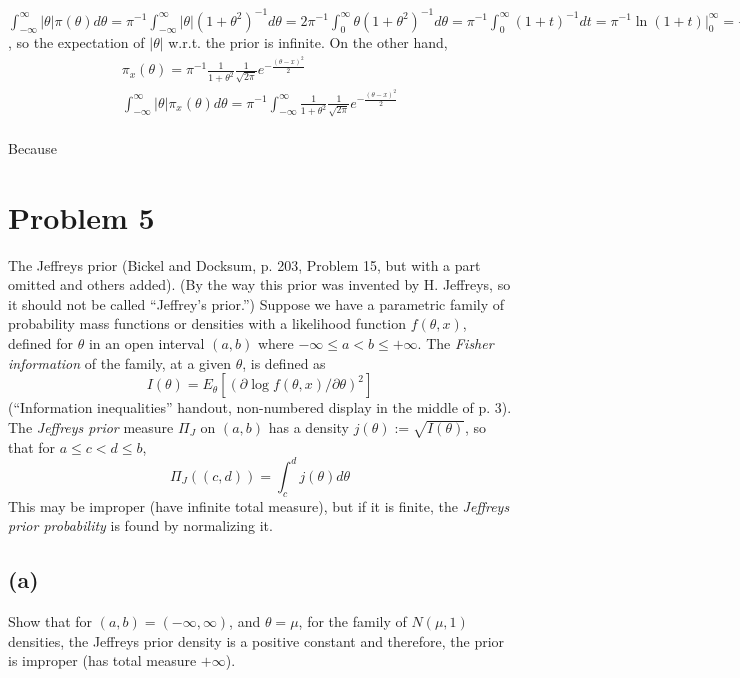 \documentclass[11pt]{article}
\newcommand{\ProbS}{\iftrue}
\newcommand{\ProbE}{\fi}
\begin{document}
$
\int_{-\infty}^{\infty} |\theta| \pi(\theta) d\theta =
\pi^{-1} \int_{-\infty}^{\infty} |\theta| (1+\theta^2)^{-1} d\theta =
2\pi^{-1} \int_{0}^{\infty} \theta (1+\theta^2)^{-1} d\theta =
\pi^{-1} \int_{0}^{\infty} (1+t)^{-1}dt =
\pi^{-1} \ln(1+t) |_{0}^{\infty} = +\infty
$
, so the expectation of $|\theta|$ w.r.t. the prior is infinite.
On the other hand,\\
\begin{align}
\pi_{x}(\theta) =
\pi^{-1} \frac{1}{1+\theta^2} \frac{1}{\sqrt{2\pi}} e^{-\frac{(\theta-x)^2}{2}}
\\
\int_{-\infty}^{\infty} |\theta| \pi_{x}(\theta) d\theta =
\pi^{-1} \int_{-\infty}^{\infty} \frac{1}{1+\theta^2} \frac{1}{\sqrt{2\pi}} e^{-\frac{(\theta-x)^2}{2}}
\end{align}
\\
Because

\section{Problem 5}
\ProbS
The Jeffreys prior (Bickel and Docksum, p. 203, Problem 15, but with a part omitted and others added). (By the way this prior was invented by H. Jeffreys, so it should not be called ``Jeffrey's prior.'')
Suppose we have a parametric family of probability mass functions or densities with a likelihood function $f(\theta, x)$, defined for $\theta$ in an open interval $(a,b)$ where $-\infty \leq a < b \leq +\infty$.
The \emph{Fisher information} of the family, at a given $\theta$, is defined as
$$
I(\theta) = E_{\theta}[(\partial \log f(\theta, x) / \partial \theta)^2]
$$
(``Information inequalities'' handout, non-numbered display in the middle of p. 3). The \emph{Jeffreys prior} measure $\Pi_{J}$ on $(a,b)$ has a density
$
j(\theta) := \sqrt{I(\theta)}
$, so that for
$a \leq c < d \leq b$,
$$
\Pi_{J}((c,d)) = \int_{c}^{d} j(\theta) d\theta
$$
This may be improper (have infinite total measure), but if it is finite, the \emph{Jeffreys prior probability} is found by normalizing it.
\ProbE

\subsection*{(a)}
\ProbS
Show that for $(a,b) = (-\infty, \infty)$, and $\theta = \mu$, for the family of $N(\mu, 1)$ densities, the Jeffreys prior density is a positive constant and therefore, the prior is improper (has total measure $+\infty$).
\ProbE
\end{document}
